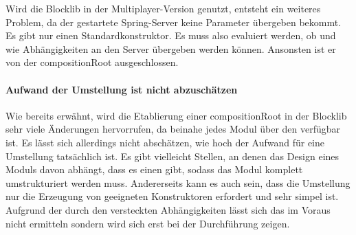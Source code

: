 Wird die Blocklib in der Multiplayer-Version genutzt, entsteht ein weiteres Problem, da der gestartete Spring-Server keine Parameter übergeben bekommt. Es gibt nur einen Standardkonstruktor. Es muss also evaluiert werden, ob und wie Abhängigkeiten an den Server übergeben werden können. Ansonsten ist er von der \gls{compositionRoot} ausgeschlossen.

\paragraph{Aufwand der Umstellung ist nicht abzuschätzen}
Wie bereits erwähnt, wird die Etablierung einer \gls{compositionRoot} in der Blocklib sehr viele Änderungen hervorrufen, da beinahe jedes Modul über den  verfügbar ist. Es lässt sich allerdings nicht abschätzen, wie hoch der Aufwand für eine Umstellung tatsächlich ist. Es gibt vielleicht Stellen, an denen das Design eines Moduls davon abhängt, dass es einen  gibt, sodass das Modul komplett umstrukturiert werden muss. Andererseits kann es auch sein, dass die Umstellung nur die Erzeugung von geeigneten Konstruktoren erfordert und sehr simpel ist. Aufgrund der durch den  versteckten Abhängigkeiten lässt sich das im Voraus nicht ermitteln sondern wird sich erst bei der Durchführung zeigen.
